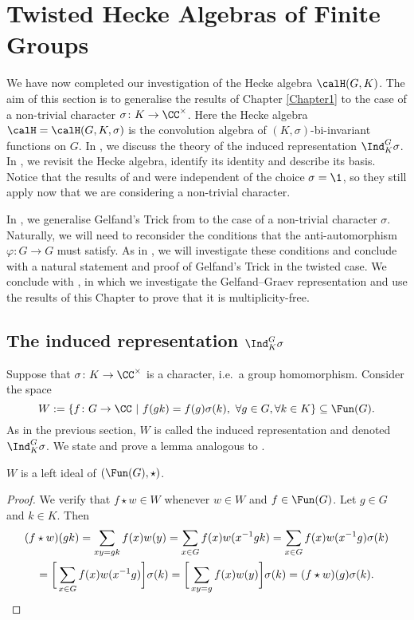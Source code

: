 \section{Twisted Hecke Algebras of Finite Groups}\label{Chapter2}
We have now completed our investigation of the Hecke algebra $\calH(G,K)$.
The aim of this section is to generalise the results of Chapter \ref{Chapter1} to the case of a non-trivial character $\sigma\colon K\to\CC^\times$.
Here the Hecke algebra $\calH=\calH(G,K,\sigma)$ is the convolution algebra of $(K,\sigma)$-bi-invariant functions on $G$.
In , we discuss the theory of the induced representation $\Ind_K^G \sigma$.
In , we revisit the Hecke algebra, identify its identity and describe its basis.
Notice that the results of  and  were independent of the choice $\sigma=\1$, so they still apply now that we are considering a non-trivial character.

In , we generalise Gelfand's Trick from  to the case of a non-trivial character $\sigma$.
Naturally, we will need to reconsider the conditions that the anti-automorphism $\varphi\colon G\to G$ must satisfy.
As in , we will investigate these conditions and conclude with a natural statement and proof of Gelfand's Trick in the twisted case.
We conclude with , in which we investigate the Gelfand--Graev representation and use the results of this Chapter to prove that it is multiplicity-free.


\subsection{The induced representation $\Ind_K^G \sigma$}\label{Section2.1}
Suppose that $\sigma\colon K \to\CC^\times$ is a character, i.e.\ a group homomorphism.
Consider the space
\[
    W := \{f\colon G\to \CC\ |\ f(gk) = f(g)\sigma(k),\ \forall g\in G, \forall k \in K\} \subseteq \Fun(G).
\]
As in the previous section, $W$ is called the induced representation and denoted $\Ind_K^G \sigma$.
We state and prove a lemma analogous to .
\begin{lem}\label{lemma: W_left_ideal_two}
    $W$ is a left ideal of $(\Fun(G),\star)$.
\end{lem}
\begin{proof}
    We verify that $f\star w\in W$ whenever $w\in W$ and $f\in\Fun(G)$.
    Let $g\in G$ and $k\in K$.
    Then
    \begin{multline*}
        (f\star w)(gk) = \sum_{xy=gk} f(x)w(y) = \sum_{x\in G} f(x)w(x^{-1}gk) = \sum_{x\in G} f(x)w(x^{-1}g)\sigma(k) \\
        = \bigg[\sum_{x\in G} f(x)w(x^{-1}g)\bigg]\sigma(k) = \bigg[\sum_{xy=g} f(x)w(y)\bigg]\sigma(k) = (f\star w)(g)\sigma(k).\qedhere
    \end{multline*}
\end{proof}

